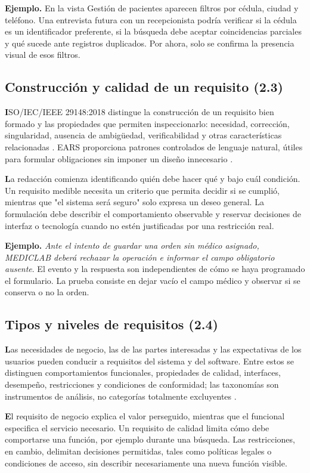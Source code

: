 \textbf{Ejemplo.} En la vista Gestión de pacientes aparecen filtros por cédula, ciudad y teléfono. Una entrevista futura con un recepcionista podría verificar si la cédula es un identificador preferente, si la búsqueda debe aceptar coincidencias parciales y qué sucede ante registros duplicados. Por ahora, solo se confirma la presencia visual de esos filtros.

\subsection{Construcción y calidad de un requisito (2.3)}
\textbf ISO/IEC/IEEE 29148:2018 distingue la construcción de un requisito bien formado y las propiedades que permiten inspeccionarlo: necesidad, corrección, singularidad, ausencia de ambigüedad, verificabilidad y otras características relacionadas \cite{iso29148}. EARS proporciona patrones controlados de lenguaje natural, útiles para formular obligaciones sin imponer un diseño innecesario \cite{mavin2009}.

\textbf La redacción comienza identificando quién debe hacer qué y bajo cuál condición. Un requisito medible necesita un criterio que permita decidir si se cumplió, mientras que "el sistema será seguro" solo expresa un deseo general. La formulación debe describir el comportamiento observable y reservar decisiones de interfaz o tecnología cuando no estén justificadas por una restricción real.

\textbf{Ejemplo.} \emph{Ante el intento de guardar una orden sin médico asignado, MEDICLAB deberá rechazar la operación e informar el campo obligatorio ausente}. El evento y la respuesta son independientes de cómo se haya programado el formulario. La prueba consiste en dejar vacío el campo médico y observar si se conserva o no la orden.

\subsection{Tipos y niveles de requisitos (2.4)}
\textbf Las necesidades de negocio, las de las partes interesadas y las expectativas de los usuarios pueden conducir a requisitos del sistema y del software. Entre estos se distinguen comportamientos funcionales, propiedades de calidad, interfaces, desempeño, restricciones y condiciones de conformidad; las taxonomías son instrumentos de análisis, no categorías totalmente excluyentes \cite{iso29148,pohl2025}.

\textbf El requisito de negocio explica el valor perseguido, mientras que el funcional especifica el servicio necesario. Un requisito de calidad limita cómo debe comportarse una función, por ejemplo durante una búsqueda. Las restricciones, en cambio, delimitan decisiones permitidas, tales como políticas legales o condiciones de acceso, sin describir necesariamente una nueva función visible.

